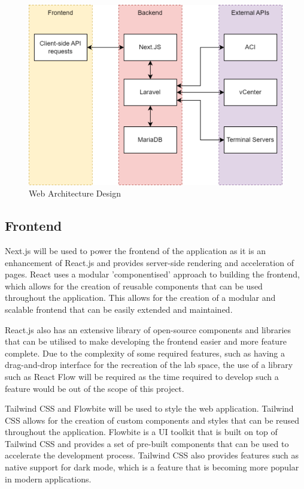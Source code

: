 \begin{figure}[H]
    \centering

    \includegraphics[scale=0.3]{images/web-architecture.png}
    \caption{Web
        Architecture Design}
    \label{fig:web-architecture}
\end{figure}

\subsection{Frontend}
\label{design:web-application:frontend}
Next.js will be
used to power the frontend of the application as it is an enhancement of
React.js and provides server-side rendering and acceleration of pages. React
uses a modular 'componentised' approach to building the frontend, which allows
for the creation of reusable components that can be used throughout the
application. This allows for the creation of a modular and scalable frontend
that can be easily extended and maintained.

React.js also has an extensive
library of open-source components and libraries that can be utilised to make
developing the frontend easier and more feature complete. Due to the complexity
of some required features, such as having a drag-and-drop interface for the
recreation of the lab space, the use of a library such as React Flow will be
required as the time required to develop such a feature would be out of the
scope of this project.

Tailwind CSS and Flowbite will be used to style the web application. Tailwind CSS allows for the creation of custom components and styles that can be reused throughout the application. Flowbite is a UI toolkit that is built on top of Tailwind CSS and provides a set of pre-built components that can be used to accelerate the development process. Tailwind CSS also provides features such as native support for dark mode, which is a feature that is becoming more popular in modern applications.

